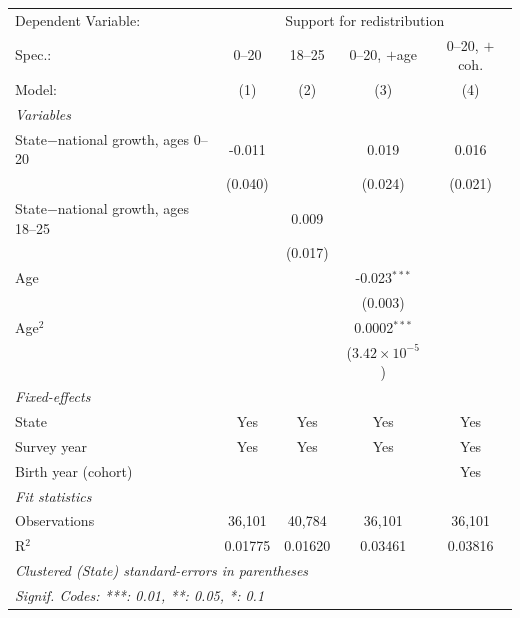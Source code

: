    \begin{tabular}{lcccc}
      \tabularnewline \midrule \midrule
      Dependent Variable: & \multicolumn{4}{c}{Support for redistribution}\\
      Spec.:                               & 0--20   & 18--25  & 0--20, $+$age           & 0--20, $+$coh. \\   
      Model:                               & (1)     & (2)     & (3)                     & (4)\\  
      \midrule
      \emph{Variables}\\
      State$-$national growth, ages 0--20  & -0.011  &         & 0.019                   & 0.016\\   
                                           & (0.040) &         & (0.024)                 & (0.021)\\   
      State$-$national growth, ages 18--25 &         & 0.009   &                         &   \\   
                                           &         & (0.017) &                         &   \\   
      Age                                  &         &         & -0.023$^{***}$          &   \\   
                                           &         &         & (0.003)                 &   \\   
      Age$^2$                              &         &         & 0.0002$^{***}$          &   \\   
                                           &         &         & ($3.42\times 10^{-5}$)  &   \\   
      \midrule
      \emph{Fixed-effects}\\
      State                                & Yes     & Yes     & Yes                     & Yes\\  
      Survey year                          & Yes     & Yes     & Yes                     & Yes\\  
      Birth year (cohort)                  &         &         &                         & Yes\\  
      \midrule
      \emph{Fit statistics}\\
      Observations                         & 36,101  & 40,784  & 36,101                  & 36,101\\  
      R$^2$                                & 0.01775 & 0.01620 & 0.03461                 & 0.03816\\  
      \midrule \midrule
      \multicolumn{5}{l}{\emph{Clustered (State) standard-errors in parentheses}}\\
      \multicolumn{5}{l}{\emph{Signif. Codes: ***: 0.01, **: 0.05, *: 0.1}}\\
   \end{tabular}
\vspace{2pt}\par{}
